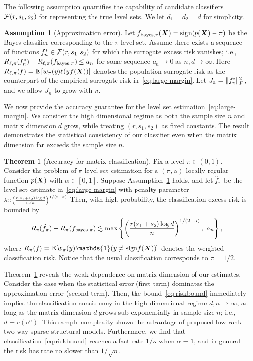 \documentclass[11pt]{article}
\theoremstyle{definition}
\newtheorem{thm}{Theorem}[section]
\newtheorem{assumption}{Assumption}
\def\sign{\textup{sign}}
\def\bayespif{f_{\textup{bayes},\pi}}
\begin{document}
The following assumption quantifies the capability of candidate classifiers $\mathcal{F}(r,s_1,s_2)$ for representing the true level sets. We let $d_1=d_2=d$ for simplicity. 

\begin{assumption}[Approximation error]\label{ass:main} 
Let $f_{\text{bayes},\pi}(\mX)=\sign(p(\mX) -\pi)$ be the Bayes classifier corresponding to the $\pi$-level set. Assume there exists a sequence of functions $f_n^*\in\mathcal{F}(r,s_1,s_2)$ for which the surrogate excess risk vanishes; i.e., $R_{\ell,\pi}(f^*_n)-R_{\ell,\pi}(\bayespif)\leq a_n$ for some sequence $a_n\to 0$ as $n,d\to \infty$. Here $R_{\ell,\pi}(f)=\mathbb{E}\left[w_\pi(y)\ell(yf(\bm X))\right]$ denotes the population surrogate risk as the counterpart of the empirical surrogate risk in~\eqref{eq:large-margin}. Let $J_n=\lVert f^*_n\rVert_F^2$, and we allow $J_n$ to grow with $n$. 
\end{assumption}

We now provide the accuracy guarantee for the level set estimation~\eqref{eq:large-margin}. We consider the high dimensional regime as both the sample size $n$ and matrix dimension $d$ grow, while treating $(r,s_1,s_2)$ as fixed constants. The result demonstrates the statistical consistency of our classifier even when the matrix dimension far exceeds the sample size $n$. 

\begin{thm}[Accuracy for matrix classification]\label{thm:main} Fix a level $\pi\in(0,1)$. Consider the problem of $\pi$-level set estimation for a $(\pi,\alpha)$-locally regular function $p(\bm X)$ with $\alpha\in[0,1]$. Suppose Assumption~\ref{ass:main} holds, and let $\hat f_\pi$ be the level set estimate in~\eqref{eq:large-margin} with penalty parameter $\scriptstyle\lambda\asymp \left( r( s_1+s_2)\log d \over  nJ_n\right)^{1/(2-\alpha)}$ Then, with high probability, the classification excess risk is bounded by 
\begin{equation}\label{eq:riskbound}
 R_{\pi}( \hat f_\pi)-R_{\pi}(\bayespif) \lesssim \max\left\{\left({r(s_1+s_2)\log d \over n}\right)^{1/(2-\alpha)},\ a_n\right\},
\end{equation}
where $R_{\pi}(f)=\mathbb{E}[w_\pi(y)\mathds{1}(y\neq \sign f(\mX))]$ denotes the weighted classification risk. Notice that the usual classification corresponds to $\pi = 1/2$. 

\end{thm}

Theorem~\ref{thm:main} reveals the weak dependence on matrix dimension of our estimates. Consider the case when the statistical error (first term) dominates the approximation error (second term). Then, the bound~\eqref{eq:riskbound} immediately implies the classification consistency in the high dimensional regime $d,n\to \infty$, as long as the matrix dimension $d$ grows sub-exponentially in sample size $n$; i.e., $d=o(e^n)$. This sample complexity shows the advantage of proposed low-rank two-way sparse structural models. Furthermore, we find that classification~\eqref{eq:riskbound} reaches a fast rate $1/n$ when $\alpha=1$, and in general the risk has rate no slower than $1/\sqrt{n}$. 
\end{document}
